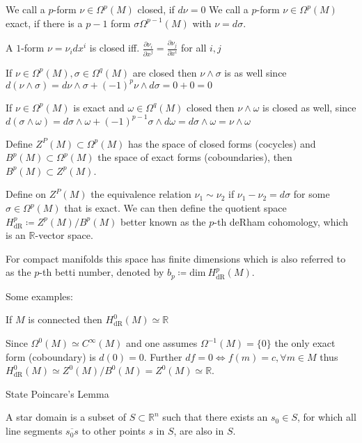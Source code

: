 We call a \( p \)-form \( \nu \in \Omega^p(M) \) closed, if
\( d\nu = 0 \)
We call a \( p \)-form \( \nu \in \Omega^p(M) \) exact, if
there is a \( p-1 \) form \( \sigma \Omega^{p-1}(M) \) with
\( \nu = d\sigma \).


A \( 1 \)-form \( \nu = \nu_i dx^i \) is closed iff. 
\( \frac{\partial \nu_i}{\partial x^j} = \frac{\partial \nu_j}{\partial x^i} \)
for all \( i,j \)

If \( \nu \in \Omega^p(M), \sigma \in \Omega^q(M) \) are closed then \( \nu \wedge \sigma \)
is as well since
\( d(\nu \wedge \sigma) = d\nu \wedge \sigma + (-1)^p \nu \wedge d\sigma = 0 + 0 = 0 \)

If \( \nu \in \Omega^p(M) \) is exact and \( \omega \in \Omega^q(M) \) closed
then \( \nu \wedge \omega \) is closed as well, since
\( d(\sigma \wedge \omega) = d\sigma \wedge \omega + (-1)^{p-1}\sigma \wedge d\omega = d\sigma \wedge \omega = \nu \wedge \omega \)

Define \( Z^P(M) \subset \Omega^p(M) \) has the space of closed forms (cocycles)
and \( B^p(M) \subset \Omega^p(M) \) the space of exact forms (coboundaries),
then \( B^p(M) \subset Z^p(M) \).

Define on \( Z^P(M) \) the equivalence relation \( \nu_1 \sim \nu_2 \) if \( \nu_1 - \nu_2 = d\sigma \)
for some \( \sigma \in \Omega^p(M) \) that is exact. We can then define the quotient space
\( H^p_{\text{dR}} \coloneqq Z^p(M)/B^p(M) \)
better known as the \( p \)-th deRham cohomology, which is an \( \mathbb{R} \)-vector space.

For compact manifolds this space has finite dimensions which is also referred to as the \( p \)-th
betti number, denoted by \( b_p \coloneqq \text{dim}\ H^p_{\text{dR}}(M)\).

Some examples:

If \( M \) is connected then \( H^0_{\text{dR}}(M) \simeq \mathbb{R} \)

Since \( \Omega^0(M) \simeq C^\infty(M) \) and one assumes \( \Omega^{-1}(M) = \{0\} \)
the only exact form (coboundary) is \( d(0) = 0 \). Further \( df = 0 \iff f(m) = c, \forall m \in M \)
thus \( H^0_{\text{dR}}(M) \simeq Z^0(M) / B^0(M) = Z^0(M) \simeq \mathbb{R} \).


State Poincare's Lemma

A star domain is a subset of \( S \subset \mathbb{R}^n \) such that there exists an \( s_0 \in S \),
for which all line segments \( \overline{s_0s} \) to other points \( s \) in \( S \), are also in \( S \).

